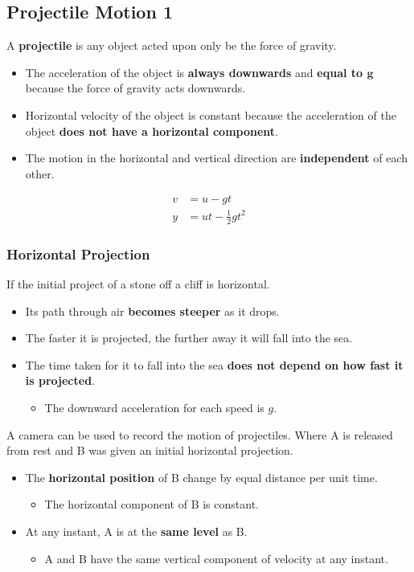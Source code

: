 \subsection{Projectile Motion 1}

A \textbf{projectile} is any object acted upon only be the force of gravity.
\begin{itemize}
    \item The acceleration of the object is \textbf{always downwards} and \textbf{equal to $\mathbf{g}$} because the force of gravity acts downwards.
    \item Horizontal velocity of the object is constant because the acceleration of the object \textbf{does not have a horizontal component}.
    \item The motion in the horizontal and vertical direction are \textbf{independent} of each other.
\end{itemize}
\begin{align*}
    v&=u-gt\\
    y&=ut-\frac{1}{2}gt^2
\end{align*}

\subsubsection*{Horizontal Projection}
If the initial project of a stone off a cliff is horizontal.
\begin{itemize}
    \item Its path through air \textbf{becomes steeper} as it drops.
    \item The faster it is projected, the further away it will fall into the sea.
    \item The time taken for it to fall into the sea \textbf{does not depend on how fast it is projected}.
        \begin{itemize}
            \item The downward acceleration for each speed is $g$.
        \end{itemize}
\end{itemize}

A camera can be used to record the motion of projectiles. Where A is released from rest and B was given an initial horizontal projection.
\begin{itemize}
    \item The \textbf{horizontal position} of B change by equal distance per unit time.
        \begin{itemize}
            \item The horizontal component of B is constant.
        \end{itemize}
    \item At any instant, A is at the \textbf{same level} as B.
        \begin{itemize}
            \item A and B have the same vertical component of velocity at any instant.
        \end{itemize}
\end{itemize}
